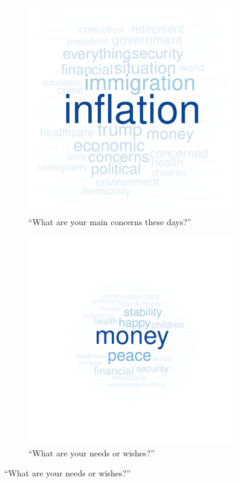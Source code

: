 \documentclass[12pt,english]{article}
\begin{document}
\begin{bibunit}
\begin{figure}[h!]
  \caption[Wordcloud of open-ended field, per variant]{Most common concepts in open-ended fields. (Questions \ref{q:concerns_field}-\ref{q:injustice_field})} \label{fig:wordcloud} %
  \begin{subfigure}{.49\textwidth}
    \caption[]{``What are your main concerns these days?''}
    \includegraphics[width=\textwidth]{../figures/all/concerns_field_en.pdf}
  \end{subfigure} 
  \begin{subfigure}{.49\textwidth}
    \caption[]{``What are your needs or wishes?''}
    \includegraphics[width=\textwidth]{../figures/all/wish_field_en.pdf}

\end{subfigure}
\end{figure}
\end{bibunit}
\end{document}
